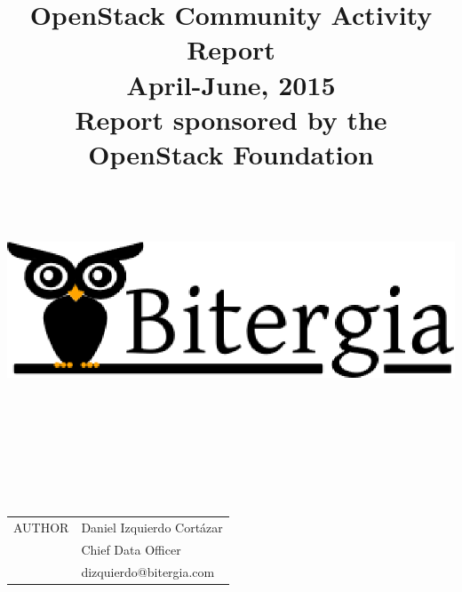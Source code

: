 \documentclass[a4wide,11pt]{report}
\begin{document}
\title{OpenStack Community Activity Report\\
      April-June, 2015 \\
      Report sponsored by the OpenStack Foundation\\
        ~~\\~~\\  \includegraphics[scale=.35]{logo.eps}       \\}




\maketitle


\newpage
~~\\~\\~\\~\\
\begin{tabular}{p{5cm}p{10cm}}
AUTHOR & Daniel Izquierdo Cort\'azar \\
       & Chief Data Officer  \\
       & dizquierdo@bitergia.com \\

\end{tabular}

~~\\~~\\


~~\\
~~\\

\begin{tabular}{p{5cm}p{10cm}}

\end{tabular}

~~\\
~~\\
\end{document}

